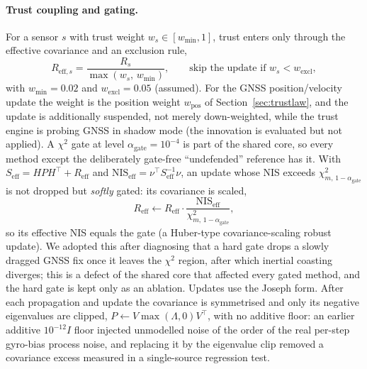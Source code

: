 \documentclass[journal]{IEEEtran}
\begin{document}
\paragraph{Trust coupling and gating.}
For a sensor $s$ with trust weight $w_s \in [w_{\min}, 1]$, trust enters only through the effective
covariance and an exclusion rule,
\begin{equation}
R_{\mathrm{eff},s} = \frac{R_s}{\max(w_s,\,w_{\min})},\qquad \text{skip the update if } w_s < w_{\mathrm{excl}},
\label{eq:reff}
\end{equation}
with $w_{\min} = 0.02$ and $w_{\mathrm{excl}} = 0.05$ (assumed). For the GNSS position/velocity update the
weight is the position weight $w_{\mathrm{pos}}$ of Section~\ref{sec:trustlaw}, and the update is additionally
suspended, not merely down-weighted, while the trust engine is probing GNSS in shadow mode (the innovation is
evaluated but not applied). A $\chi^2$ gate at level
$\alpha_{\mathrm{gate}} = 10^{-4}$ is part of the shared core, so every method except the deliberately
gate-free ``undefended'' reference has it. With $S_{\mathrm{eff}} = H P H^{\top} + R_{\mathrm{eff}}$ and
$\mathrm{NIS}_{\mathrm{eff}} = \nu^{\top} S_{\mathrm{eff}}^{-1}\nu$, an update whose NIS exceeds
$\chi^2_{m,\,1-\alpha_{\mathrm{gate}}}$ is not dropped but \emph{softly} gated: its covariance is scaled,
\begin{equation}
R_{\mathrm{eff}} \leftarrow R_{\mathrm{eff}}\cdot \frac{\mathrm{NIS}_{\mathrm{eff}}}{\chi^2_{m,\,1-\alpha_{\mathrm{gate}}}},
\label{eq:softgate}
\end{equation}
so its effective NIS equals the gate (a Huber-type covariance-scaling robust update). We adopted this after
diagnosing that a hard gate drops a slowly dragged GNSS fix once it leaves the $\chi^2$ region, after which
inertial coasting diverges; this is a defect of the shared core that affected every gated method, and the
hard gate is kept only as an ablation. Updates use the Joseph form. After each propagation and update the
covariance is symmetrised and only its negative eigenvalues are clipped, $P \leftarrow V\max(\Lambda,0)V^{\top}$,
with no additive floor: an earlier additive $10^{-12} I$ floor injected unmodelled noise of the order of the
real per-step gyro-bias process noise, and replacing it by the eigenvalue clip removed a covariance excess measured in a single-source regression test.
\end{document}
